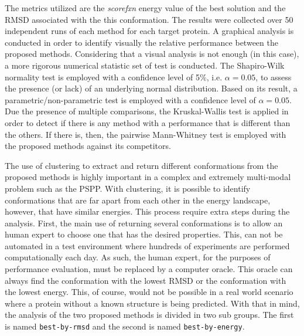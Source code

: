 The metrics utilized are the \textit{scorefxn} energy value of the
best solution and the \ac{RMSD} associated with the this conformation. The
results were collected over 50 independent runs of each method for each target
protein. A graphical analysis is conducted in order to identify visually the
relative performance between the proposed methods. Considering that a visual
analysis is not enough (in this case), a more rigorous numerical statistic set
of test is conducted. The Shapiro-Wilk~\cite{wilk1968joint} normality test is
employed with a confidence level of 5\%, i.e. $\alpha = 0.05$, to assess the
presence (or lack) of an underlying normal distribution. Based on its result, a
parametric/non-parametric test is employed with a confidence level of $\alpha =
0.05$. Due the presence of multiple comparisons, the Kruskal-Wallis test is
applied in order to detect if there is any method with a performance that
is different than the others. If there is, then, the pairwise Mann-Whitney test is
employed with the proposed methods against its competitors.

The use of clustering to extract and return different conformations from the
proposed methods is highly important in a complex and extremely multi-modal
problem such as the PSPP. With clustering, it is possible to identify conformations
that are far apart from each other in the energy landscape, however, that have
similar energies. This process require extra steps during the analysis.
First, the main use of
returning several conformations is to allow an human expert to choose one that
has the desired properties. This, can not be automated in a test environment where
hundreds of experiments are performed computationally each day. As such, the human
expert, for the purposes of performance evaluation, must be replaced by a
computer oracle. This oracle can always find the conformation with the lowest
RMSD or the conformation with the lowest energy. This, of course, would not
be possible in a real world scenario where a protein without a known structure is
being predicted. With that in mind, the analysis of the two proposed methods is
divided in two sub groups. The first is named \texttt{best-by-rmsd} and the second
is named \texttt{best-by-energy}.

